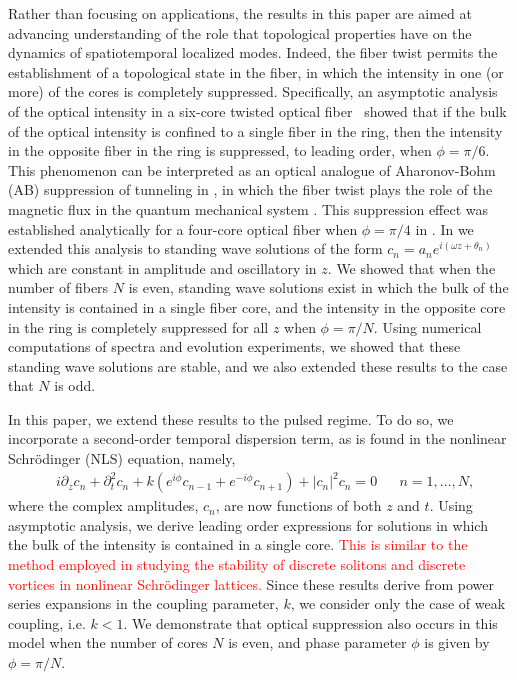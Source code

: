\documentclass[11pt,reqno]{amsart}
\newcommand{\revised}[1]{ \textcolor{red}{#1} }
\begin{document}
Rather than focusing on applications, the results in this paper are aimed at advancing  understanding of the role that topological properties have on the dynamics of spatiotemporal localized modes. 
Indeed, the fiber twist permits the establishment of a topological state in the fiber, in which the intensity in one (or more) of the cores is completely suppressed. Specifically, an asymptotic analysis of the optical intensity in a  six-core twisted optical fiber~\cite{castro2016} showed that if the bulk of the optical intensity is confined to a single fiber in the ring, then the intensity in the opposite fiber in the ring is suppressed, to leading order, when $\phi = \pi/6$. This phenomenon can be interpreted as an optical analogue of Aharonov-Bohm (AB) suppression of tunneling in \cite{Ornigotti2007,Parto2017,Parto2019}, in which the fiber twist plays the role of the magnetic flux in the quantum mechanical system \cite{Loss1992}. This suppression effect was established analytically for a four-core optical fiber when $\phi=\pi/4$ in \cite{Parto2019}. In \cite{parker2021} we extended this analysis to standing wave solutions of the form $c_n = a_n e^{i (\omega z + \theta_n) }$ which are constant in amplitude and oscillatory in $z$. We showed that when the number of fibers $N$ is even, standing wave solutions exist in which the bulk of the intensity is contained in a single fiber core, and the intensity in the opposite core in the ring is completely suppressed for all $z$ when $\phi = \pi/N$. Using numerical computations of spectra and evolution experiments, we showed that these standing wave solutions are stable, and we also extended these results to the case that $N$ is odd.

In this paper, we extend these results to the pulsed regime. To do so, we incorporate a second-order temporal dispersion term, as is found in the nonlinear Schr\"odinger (NLS) equation, namely,
\begin{align}\label{eq:cnz}
&i\partial_z c_n + \partial_t^2 c_n + k\left(e^{i\phi}c_{n-1}+e^{-i\phi}c_{n+1}\right)+|c_n|^2 c_n = 0 && n = 1, \dots, N,
\end{align}
where the complex amplitudes, $c_n$, are now functions of both $z$ and $t$. Using asymptotic analysis, we derive leading order expressions for solutions in which the bulk of the intensity is contained in a single core. 
\revised{
This is similar to the method employed in studying the stability of discrete solitons \cite{pelinovsky2005a} and discrete vortices \cite{pelinovsky2005b} in nonlinear Schr\"odinger lattices.   
}
Since these results derive from power series expansions in the coupling parameter, $k$, we consider only the case of weak coupling, i.e. $k < 1$.
We demonstrate that optical suppression also occurs in this model when the number of cores $N$ is even, and phase parameter $\phi$ is given by $\phi=\pi/N$. 
\end{document}

